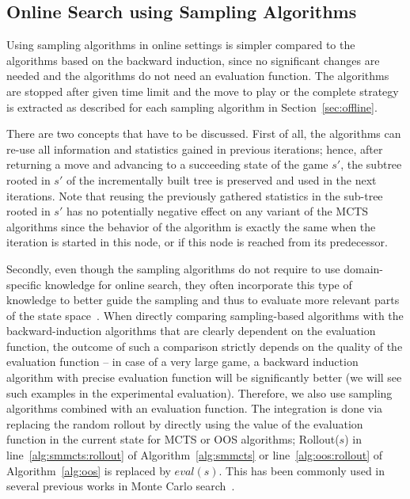 \subsection{Online Search using Sampling Algorithms}


Using sampling algorithms in online settings is simpler compared to the algorithms based on the backward induction, since no significant changes are needed and the algorithms do not need an evaluation function.
The algorithms are stopped after given time limit and the move to play or the complete strategy is extracted as described for each sampling algorithm in Section~\ref{sec:offline}.

There are two concepts that have to be discussed.
First of all, the algorithms can re-use all information and statistics gained in previous iterations; hence, after returning a move and advancing to a succeeding state of the game $s'$, the subtree rooted in $s'$ of the incrementally built tree is preserved and used in the next iterations.
Note that reusing the previously gathered statistics in the sub-tree rooted in $s'$ has no potentially negative effect on any variant of the MCTS algorithms since the behavior of the algorithm is exactly the same when the iteration is started in this node, or if this node is reached from its predecessor. 

Secondly, even though the sampling algorithms do not require to use domain-specific knowledge for online search, they often incorporate this type of knowledge to better guide the sampling and thus to evaluate more relevant parts of the state space~\cite{Gelly07Combining,Lorentz08Amazons,Winands10MCTS-LOA,Lorentz13Breakthrough,Lanctot14Implicit}. When directly comparing sampling-based algorithms with the backward-induction algorithms that are clearly dependent on the evaluation function, the outcome of such a comparison strictly depends on the quality of the evaluation function -- in case of a very large game, a backward induction algorithm with precise evaluation function will be significantly better (we will see such examples in the experimental evaluation). Therefore, we also use sampling algorithms combined with an evaluation function. The integration is done via replacing the random rollout
by directly using the value of the evaluation function in the current state for MCTS or OOS algorithms; \ie Rollout($s$) in
line~\ref{alg:smmcts:rollout} of Algorithm~\ref{alg:smmcts} or line~\ref{alg:oos:rollout} of Algorithm~\ref{alg:oos} is replaced by $eval(s)$.
This has been commonly used in several previous works in Monte Carlo search~\cite{Lorentz08Amazons,Lorentz13Breakthrough,Lanctot14Implicit,RamanujanS11,Lanctot13MCMS}.

